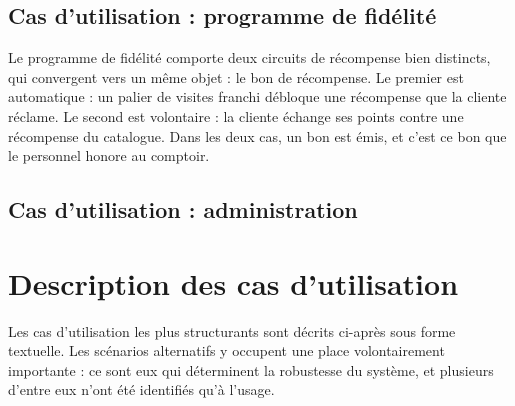 
\subsection{Cas d'utilisation : programme de fidélité}

Le programme de fidélité comporte deux circuits de récompense bien
distincts, qui convergent vers un même objet : le bon de récompense. Le premier
est automatique : un palier de visites franchi débloque une récompense que la
cliente réclame. Le second est volontaire : la cliente échange ses points
contre une récompense du catalogue. Dans les deux cas, un bon est émis, et
c'est ce bon que le personnel honore au comptoir.


\subsection{Cas d'utilisation : administration}


\section{Description des cas d'utilisation}

Les cas d'utilisation les plus structurants sont décrits ci-après sous forme
textuelle. Les scénarios alternatifs y occupent une place volontairement
importante : ce sont eux qui déterminent la robustesse du système, et plusieurs
d'entre eux n'ont été identifiés qu'à l'usage.

